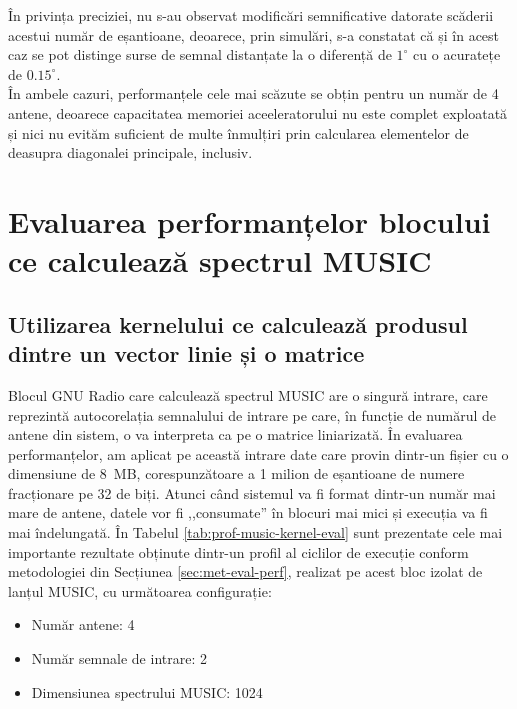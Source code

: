 În privința preciziei, nu s-au observat modificări semnificative datorate
scăderii acestui număr de eșantioane, deoarece, prin simulări, s-a constatat că și
în acest caz se pot distinge surse de semnal distanțate la o diferență de
$1^{\circ}$ cu o acuratețe de $0.15^{\circ}$. \\

În ambele cazuri, performanțele cele mai scăzute se obțin pentru un număr de 4
antene, deoarece capacitatea memoriei aceeleratorului nu este complet
exploatată și nici nu evităm suficient de multe înmulțiri prin calcularea elementelor
de deasupra diagonalei principale, inclusiv.


\section{Evaluarea performanțelor blocului ce calculează spectrul MUSIC}
\label{sec:eval-music}

\subsection{Utilizarea kernelului ce calculează produsul dintre un vector linie
și o matrice}
\label{sec:eval-music-vecmat}

Blocul GNU Radio care calculează spectrul MUSIC are o singură intrare, care
reprezintă autocorelația semnalului de intrare pe care, în funcție de numărul de
antene din sistem, o va interpreta ca pe o matrice liniarizată. În evaluarea
performanțelor, am aplicat pe această intrare date care provin dintr-un fișier
cu o dimensiune de \SI{8}{MB}, corespunzătoare a 1 milion de eșantioane de numere
fracționare pe 32 de biți. Atunci când sistemul va fi format dintr-un număr mai
mare de antene, datele vor fi ,,consumate'' în blocuri mai mici și execuția va
fi mai îndelungată. În Tabelul \ref{tab:prof-music-kernel-eval} sunt prezentate
cele mai importante rezultate obținute dintr-un profil al ciclilor de execuție
conform metodologiei din Secțiunea \ref{sec:met-eval-perf}, realizat pe acest
bloc izolat de lanțul MUSIC,  cu următoarea configurație: 
\begin{itemize}
  \item Număr antene: 4
  \item Număr semnale de intrare: 2
  \item Dimensiunea spectrului MUSIC: 1024
\end{itemize}

